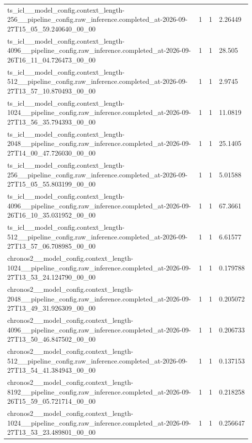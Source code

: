 \begin{tabular}{llll}
ts\_icl\_\_model\_config.context\_length-256\_\_pipeline\_config.raw\_inference.completed\_at-2026-09-27T15\_05\_59.240640\_00\_00 & 1 & 1 & 2.26449 \\
ts\_icl\_\_model\_config.context\_length-4096\_\_pipeline\_config.raw\_inference.completed\_at-2026-09-26T16\_11\_04.726473\_00\_00 & 1 & 1 & 28.505 \\
ts\_icl\_\_model\_config.context\_length-512\_\_pipeline\_config.raw\_inference.completed\_at-2026-09-27T13\_57\_10.870493\_00\_00 & 1 & 1 & 2.9745 \\
ts\_icl\_\_model\_config.context\_length-1024\_\_pipeline\_config.raw\_inference.completed\_at-2026-09-27T13\_56\_35.794393\_00\_00 & 1 & 1 & 11.0819 \\
ts\_icl\_\_model\_config.context\_length-2048\_\_pipeline\_config.raw\_inference.completed\_at-2026-09-27T14\_00\_47.726030\_00\_00 & 1 & 1 & 25.1405 \\
ts\_icl\_\_model\_config.context\_length-256\_\_pipeline\_config.raw\_inference.completed\_at-2026-09-27T15\_05\_55.803199\_00\_00 & 1 & 1 & 5.01588 \\
ts\_icl\_\_model\_config.context\_length-4096\_\_pipeline\_config.raw\_inference.completed\_at-2026-09-26T16\_10\_35.031952\_00\_00 & 1 & 1 & 67.3661 \\
ts\_icl\_\_model\_config.context\_length-512\_\_pipeline\_config.raw\_inference.completed\_at-2026-09-27T13\_57\_06.708985\_00\_00 & 1 & 1 & 6.61577 \\
chronos2\_\_model\_config.context\_length-1024\_\_pipeline\_config.raw\_inference.completed\_at-2026-09-27T13\_53\_24.124790\_00\_00 & 1 & 1 & 0.179788 \\
chronos2\_\_model\_config.context\_length-2048\_\_pipeline\_config.raw\_inference.completed\_at-2026-09-27T13\_49\_31.926309\_00\_00 & 1 & 1 & 0.205072 \\
chronos2\_\_model\_config.context\_length-4096\_\_pipeline\_config.raw\_inference.completed\_at-2026-09-27T13\_50\_46.847502\_00\_00 & 1 & 1 & 0.206733 \\
chronos2\_\_model\_config.context\_length-512\_\_pipeline\_config.raw\_inference.completed\_at-2026-09-27T13\_54\_41.384943\_00\_00 & 1 & 1 & 0.137153 \\
chronos2\_\_model\_config.context\_length-8192\_\_pipeline\_config.raw\_inference.completed\_at-2026-09-26T15\_59\_05.721714\_00\_00 & 1 & 1 & 0.218258 \\
chronos2\_\_model\_config.context\_length-1024\_\_pipeline\_config.raw\_inference.completed\_at-2026-09-27T13\_53\_23.489801\_00\_00 & 1 & 1 & 0.256647 \\

\end{tabular}
